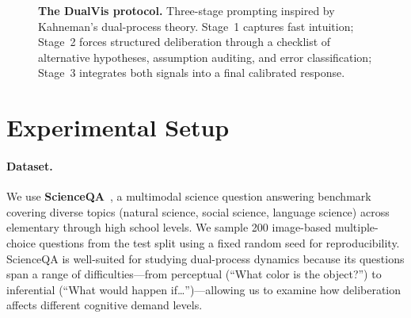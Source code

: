 \documentclass{cvpr}
\newcommand{\method}{DualVis}
\begin{document}
\begin{figure}[t]
\centering
{}
\caption{\textbf{The \method{} protocol.} Three-stage prompting inspired by Kahneman's dual-process theory. Stage~1 captures fast intuition; Stage~2 forces structured deliberation through a checklist of alternative hypotheses, assumption auditing, and error classification; Stage~3 integrates both signals into a final calibrated response.}
\label{fig:overview}
\end{figure}

\section{Experimental Setup}

\paragraph{Dataset.}
We use \textbf{ScienceQA}~\cite{lu2022learn}, a multimodal science question answering benchmark covering diverse topics (natural science, social science, language science) across elementary through high school levels. We sample 200 image-based multiple-choice questions from the test split using a fixed random seed for reproducibility. ScienceQA is well-suited for studying dual-process dynamics because its questions span a range of difficulties---from perceptual (``What color is the object?'') to inferential (``What would happen if\ldots'')---allowing us to examine how deliberation affects different cognitive demand levels.
\end{document}
